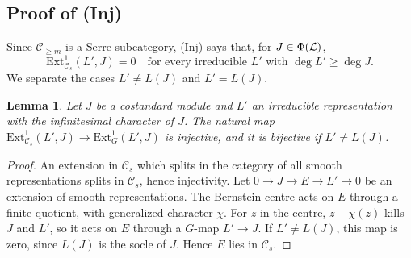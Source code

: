 \documentclass[a4paper,12pt,leqno]{amsart}
\theoremstyle{plain}
\newtheorem{lemma}[thm]{Lemma}
\theoremstyle{definition}
\begin{document}
\subsection{Proof of (Inj)}\label{ssec:inj}
Since $\mathcal{C}_{\geq m}$ is a Serre subcategory, (Inj) says that, for $J\in\Phi(\mathcal{L})$,
\[\mathrm{Ext}^1_{\mathcal{C}_s}(L',J)=0\quad\text{for every irreducible }L'\text{ with }\deg L'\geq\deg J.\] We separate
the cases $L'\neq L(J)$ and $L'=L(J)$.

\begin{lemma}\label{lem:extcs} Let $J$ be a costandard module and $L'$ an irreducible representation
with the infinitesimal character of $J$. The natural map $\mathrm{Ext}^1_{\mathcal{C}_s}(L',J)\to
\mathrm{Ext}^1_G(L',J)$ is injective, and it is bijective if $L'\neq L(J)$.
\end{lemma}

\begin{proof}
An extension in $\mathcal{C}_s$ which splits in the category of all smooth representations splits in
$\mathcal{C}_s$, hence injectivity. Let $0\to J\to E\to L'\to0$ be an extension of smooth representations.
The Bernstein centre acts on $E$ through a finite quotient, with generalized character $\chi$. For $z$ in
the centre, $z-\chi(z)$ kills $J$ and $L'$, so it acts on $E$ through a $G$-map $L'\to J$. If
$L'\neq L(J)$, this map is zero, since $L(J)$ is the socle of $J$. Hence $E$ lies in $\mathcal{C}_s$.
\end{proof}
\end{document}
